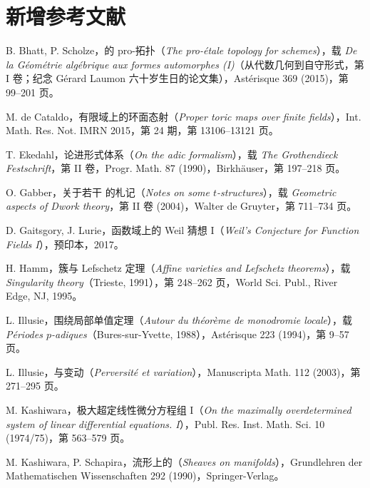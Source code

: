 \chapter*{新增参考文献}
\begin{description}[style=nextline,leftmargin=5em,labelwidth=4.5em,font=\normalfont,itemsep=.7\baselineskip]
\item[{[BS15]}] B. Bhatt, P. Scholze，的 pro-拓扑（\emph{The pro-étale topology for schemes}），载 \emph{De la Géométrie algébrique aux formes automorphes (I)}（从代数几何到自守形式，第 I 卷；纪念 Gérard Laumon 六十岁生日的论文集），Astérisque 369 (2015)，第 99--201 页。
\item[{[dC15]}] M. de Cataldo，有限域上的环面态射（\emph{Proper toric maps over finite fields}），Int. Math. Res. Not. IMRN 2015，第 24 期，第 13106--13121 页。
\item[{[Eke90]}] T. Ekedahl，论进形式体系（\emph{On the adic formalism}），载 \emph{The Grothendieck Festschrift}，第 II 卷，Progr. Math. 87 (1990)，Birkhäuser，第 197--218 页。
\item[{[Gab04]}] O. Gabber，关于若干 的札记（\emph{Notes on some $t$-structures}），载 \emph{Geometric aspects of Dwork theory}，第 II 卷 (2004)，Walter de Gruyter，第 711--734 页。
\item[{[GL17]}] D. Gaitsgory, J. Lurie，函数域上的 Weil 猜想 I（\emph{Weil's Conjecture for Function Fields I}），预印本，2017。
\item[{[Ham95]}] H. Hamm，簇与 Lefschetz 定理（\emph{Affine varieties and Lefschetz theorems}），载 \emph{Singularity theory}（Trieste, 1991），第 248--262 页，World Sci. Publ., River Edge, NJ, 1995。
\item[{[Ill94]}] L. Illusie，围绕局部单值定理（\emph{Autour du théorème de monodromie locale}），载 \emph{Périodes $p$-adiques}（Bures-sur-Yvette, 1988），Astérisque 223 (1994)，第 9--57 页。
\item[{[Ill03]}] L. Illusie，与变动（\emph{Perversité et variation}），Manuscripta Math. 112 (2003)，第 271--295 页。
\item[{[Kas75]}] M. Kashiwara，极大超定线性微分方程组 I（\emph{On the maximally overdetermined system of linear differential equations. I}），Publ. Res. Inst. Math. Sci. 10 (1974/75)，第 563--579 页。
\item[{[KS90]}] M. Kashiwara, P. Schapira，流形上的（\emph{Sheaves on manifolds}），Grundlehren der Mathematischen Wissenschaften 292 (1990)，Springer-Verlag。

\end{description}
